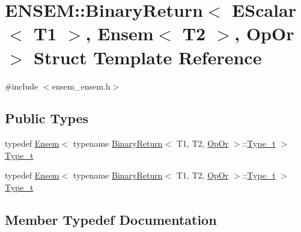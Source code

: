 \hypertarget{structENSEM_1_1BinaryReturn_3_01EScalar_3_01T1_01_4_00_01Ensem_3_01T2_01_4_00_01OpOr_01_4}{}\section{E\+N\+S\+EM\+:\+:Binary\+Return$<$ E\+Scalar$<$ T1 $>$, Ensem$<$ T2 $>$, Op\+Or $>$ Struct Template Reference}
\label{structENSEM_1_1BinaryReturn_3_01EScalar_3_01T1_01_4_00_01Ensem_3_01T2_01_4_00_01OpOr_01_4}


{\ttfamily \#include $<$ensem\+\_\+ensem.\+h$>$}

\subsection*{Public Types}
\begin{DoxyCompactItemize}
\item 
typedef \mbox{\hyperlink{classENSEM_1_1Ensem}{Ensem}}$<$ typename \mbox{\hyperlink{structENSEM_1_1BinaryReturn}{Binary\+Return}}$<$ T1, T2, \mbox{\hyperlink{structENSEM_1_1OpOr}{Op\+Or}} $>$\+::\mbox{\hyperlink{structENSEM_1_1BinaryReturn_3_01EScalar_3_01T1_01_4_00_01Ensem_3_01T2_01_4_00_01OpOr_01_4_a84f29080070490dfc3b1eb1b69150380}{Type\+\_\+t}} $>$ \mbox{\hyperlink{structENSEM_1_1BinaryReturn_3_01EScalar_3_01T1_01_4_00_01Ensem_3_01T2_01_4_00_01OpOr_01_4_a84f29080070490dfc3b1eb1b69150380}{Type\+\_\+t}}
\item 
typedef \mbox{\hyperlink{classENSEM_1_1Ensem}{Ensem}}$<$ typename \mbox{\hyperlink{structENSEM_1_1BinaryReturn}{Binary\+Return}}$<$ T1, T2, \mbox{\hyperlink{structENSEM_1_1OpOr}{Op\+Or}} $>$\+::\mbox{\hyperlink{structENSEM_1_1BinaryReturn_3_01EScalar_3_01T1_01_4_00_01Ensem_3_01T2_01_4_00_01OpOr_01_4_a84f29080070490dfc3b1eb1b69150380}{Type\+\_\+t}} $>$ \mbox{\hyperlink{structENSEM_1_1BinaryReturn_3_01EScalar_3_01T1_01_4_00_01Ensem_3_01T2_01_4_00_01OpOr_01_4_a84f29080070490dfc3b1eb1b69150380}{Type\+\_\+t}}
\end{DoxyCompactItemize}


\subsection{Member Typedef Documentation}
\mbox{\label{structENSEM_1_1BinaryReturn_3_01EScalar_3_01T1_01_4_00_01Ensem_3_01T2_01_4_00_01OpOr_01_4_a84f29080070490dfc3b1eb1b69150380}} 
